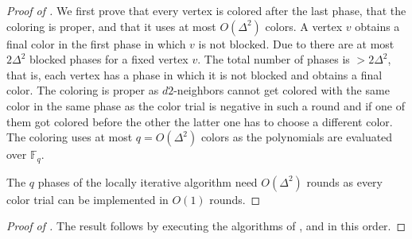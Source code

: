 \begin{proof}[Proof of ]
We first prove that every vertex is colored after the last phase, that the coloring is proper, and that it uses at most $O(\Delta^2)$ colors. 
A vertex $v$ obtains a final color in the first phase in which $v$ is not blocked. Due to  there are at most $2\Delta^2$ blocked phases for a fixed vertex $v$. The total number of phases is $>2\Delta^2$, that is, each vertex has a phase in which it is not blocked and obtains a final color. The coloring is proper as $d2$-neighbors cannot get colored with the same color in the same phase as the color trial is negative in such a round and if one of them got colored before the other the latter one has to choose a different color. The coloring uses at most $q=O(\Delta^2)$ colors as the polynomials are evaluated over $\mathbb{F}_q$. 

The $q$ phases of the locally iterative algorithm need $O(\Delta^2)$ rounds as every color trial can be implemented in $O(1)$ rounds.
\end{proof}

\begin{proof}[Proof of ]
The result follows by executing the algorithms of ,  and  in this order. 
\end{proof}






